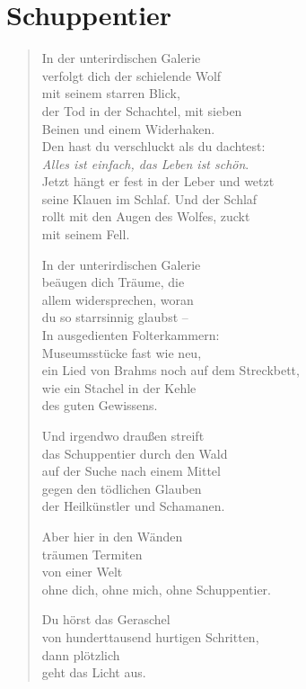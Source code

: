 
\cleartoverso

\section{Schuppentier}

\begin{verse}

In der unterirdischen Galerie\\
verfolgt dich der schielende Wolf\\
mit seinem starren Blick,\\
der Tod in der Schachtel, mit sieben\\
Beinen und einem Widerhaken.\\
Den hast du verschluckt als du dachtest:\\
\emph{Alles ist einfach, das Leben ist schön}.\\
Jetzt hängt er fest in der Leber und wetzt\\
seine Klauen im Schlaf. Und der Schlaf\\
rollt mit den Augen des Wolfes, zuckt\\
mit seinem Fell.

In der unterirdischen Galerie\\
beäugen dich Träume, die\\
allem widersprechen, woran\\
du so starrsinnig glaubst --\\
In ausgedienten Folterkammern:\\
Museumsstücke fast wie neu,\\
ein Lied von Brahms noch auf dem Streckbett,\\
wie ein Stachel in der Kehle\\
des guten Gewissens.

\clearpage

Und irgendwo draußen streift\\
das Schuppentier durch den Wald\\
auf der Suche nach einem Mittel\\
gegen den tödlichen Glauben\\
der Heilkünstler und Schamanen.

Aber hier in den Wänden\\
träumen Termiten\\
von einer Welt\\
ohne dich, ohne mich, ohne Schuppentier.

Du hörst das Geraschel\\
von hunderttausend hurtigen Schritten,\\
dann plötzlich\\
geht das Licht aus.

\end{verse}

